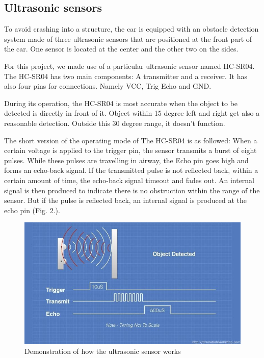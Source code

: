 \documentclass[conference]{IEEEtran}
\begin{document}
\subsection{Ultrasonic sensors}
To avoid crashing into a structure, the car is equipped with an obstacle detection system made of three ultrasonic sensors that are positioned at the front part of the car. One sensor is located at the center and the other two on the sides.

For this project, we made use of a particular ultrasonic sensor named HC-SR04. The HC-SR04 has two main components: A transmitter and a receiver. It has also four pins for connections. Namely VCC, Trig Echo and GND.

During its operation, the HC-SR04 is most accurate when the object to be detected is directly in front of it. Object within 15 degree left and right get also a reasonable detection.  Outside this 30 degree range, it doesn't function.

The short version of the operating mode of The HC-SR04 is as followed: 
When a certain voltage is applied to the trigger pin, the sensor transmits a burst of eight pulses. While these pulses are travelling in airway, the Echo pin goes high and forms an echo-back signal.
If the transmitted pulse is not reflected back, within a certain amount of time, the echo-back signal timeout and fades out. An internal signal is then produced to indicate there is no obstruction within the range of the sensor. 
But if the pulse is reflected back, an internal signal is produced at the echo pin (Fig. 2.). 
\begin{figure}[h!]
	\includegraphics[width=\linewidth]{USSin.jpg}
	\caption{Demonstration of how the ultrasonic sensor works}
	\label{fig:UMLSM1}
\end{figure}
\end{document}
